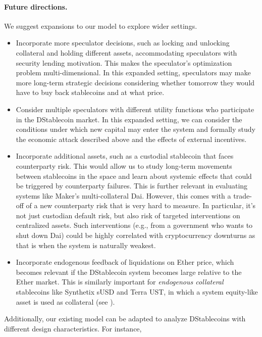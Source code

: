 \paragraph{Future directions.}
We suggest expansions to our model to explore wider settings.
\begin{itemize}
	\item Incorporate more speculator decisions, such as locking and unlocking collateral and holding different assets, accommodating speculators with security lending motivation. This makes the speculator's optimization problem multi-dimensional. In this expanded setting, speculators may make more long-term strategic decisions considering whether tomorrow they would have to buy back stablecoins and at what price.
	\item Consider multiple speculators with different utility functions who participate in the DStablecoin market. In this expanded setting, we can consider the conditions under which new capital may enter the system and formally study the economic attack described above and the effects of external incentives.
	\item Incorporate additional assets, such as a custodial stablecoin that faces counterparty risk. This would allow us to study long-term movements between stablecoins in the space and learn about systemic effects that could be triggered by counterparty failures. This is further relevant in evaluating systems like Maker's multi-collateral Dai. However, this comes with a trade-off of a new counterparty risk that is very hard to measure. In particular, it's not just custodian default risk, but also risk of targeted interventions on centralized assets. Such interventions (e.g., from a government who wants to shut down Dai) could be highly correlated with cryptocurrency downturns as that is when the system is naturally weakest.
	\item Incorporate endogenous feedback of liquidations on Ether price, which becomes relevant if the DStablecoin system becomes large relative to the Ether market. This is similarly important for \emph{endogenous collateral} stablecoins like Synthetix sUSD and Terra UST, in which a system equity-like asset is used as collateral (see \cite{klagesmundt2020stablecoins}).
\end{itemize}
Additionally, our existing model can be adapted to analyze DStablecoins with different design characteristics. For instance,
